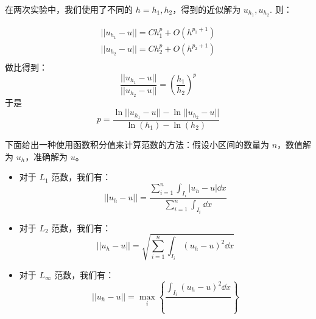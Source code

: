 \documentclass{article}
\numberwithin{equation}{subsection}    %
\begin{document}
\begin{appendix}
    在两次实验中，我们使用了不同的 $h=h_1,h_2$，得到的近似解为 $u_{h_1},u_{h_2}$. 则：

    \begin{equation}
        \begin{aligned}
            || u_{h_1}-u || = Ch_1^p + O(h^{p_1+1}) \\
            || u_{h_2}-u || = Ch_2^p + O(h^{p_2+1}) \\
        \end{aligned}
    \end{equation}
    做比得到：
    \begin{equation}
        \frac{|| u_{h_1}-u ||}{|| u_{h_2}-u ||} = \left(\frac{h_1}{h_2}\right)^p
    \end{equation}
    于是
    \begin{equation}
        p = \frac{\ln|| u_{h_1}-u ||-\ln|| u_{h_2}-u ||}{\ln(h_1)-\ln(h_2)}
    \end{equation}

    下面给出一种使用函数积分值来计算范数的方法：假设小区间的数量为 $n$，数值解为 $u_h$，准确解为 $u$。
    \begin{itemize}
        \item 对于 $L_1$ 范数，我们有：
              \begin{equation}
                  || u_{h}-u || = \frac{\sum_{i=1}^{n}\int_{I_i}|u_{h}-u|\dd x }{\sum_{i=1}^{n}\int_{I_i}\dd x}
              \end{equation}

        \item 对于 $L_2$ 范数，我们有：
              \begin{equation}
                  || u_{h}-u || = \sqrt{\sum_{i=1}^{n}\int_{I_i}\left(u_{h}-u\right)^2\dd x}
              \end{equation}
        \item 对于 $L_\infty$ 范数，我们有：
              \begin{equation}
                  || u_{h}-u || = \max_i \left\{\frac{\int_{I_i}\left(u_{h}-u\right)^2\dd x}{} \right\}
              \end{equation}
    \end{itemize}



\end{appendix}
\end{document}
